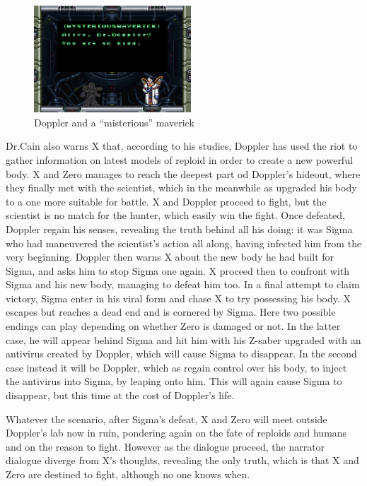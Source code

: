 \begin{figure}[htp]
	\centering
	\includegraphics[height=4cm]{figures/X3/Story_2.jpg}
	\caption{Doppler and a ``misterious'' maverick}
\end{figure} Dr.Cain also warns X that, according to his studies, Doppler has used the riot to gather information on latest models of reploid in order to create a new powerful body. X and Zero manages to reach the deepest part od Doppler's hideout, where they finally met with the scientist, which in the meanwhile as upgraded his body to a one more suitable for battle. X and Doppler proceed to fight, but the scientist is no match for the hunter, which easily win the fight. Once defeated, Doppler regain his senses, revealing the truth behind all his doing: it was Sigma who had maneuvered the scientist's action all along, having infected him from the very beginning. Doppler then warns X about the new body he had built for Sigma, and asks him to stop Sigma one again. X proceed then to confront with Sigma and his new body, managing to defeat him too. In a final attempt to claim victory, Sigma enter in his viral form and chase X to try possessing his body. X escapes but reaches a dead end and is cornered by Sigma. Here two possible endings can play depending on whether Zero is damaged or not. In the latter case, he will appear behind Sigma and hit him with his Z-saber upgraded with an antivirus created by Doppler, which will cause Sigma to disappear. In the second case instead it will be Doppler, which as regain control over his body, to inject the antivirus into Sigma, by leaping onto him. This will again cause Sigma to disappear, but this time at the cost of Doppler's life.

Whatever the scenario, after Sigma's defeat, X and Zero will meet outside Doppler's lab now in ruin, pondering again on the fate of reploids and humans and on the reason to fight. However as the dialogue proceed, the narrator dialogue diverge from X's thoughts, revealing the only truth, which is that X and Zero are destined to fight, although no one knows when.

